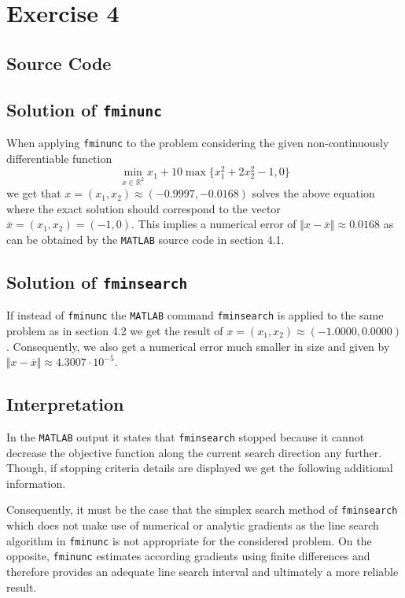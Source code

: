 \documentclass{article}
\begin{document}
	\section{Exercise 4}
	\subsection{Source Code}
	
	
	\subsection{Solution of \texttt{fminunc}}
	When applying \texttt{fminunc} to the problem considering the given non-continuously differentiable function 
	\begin{equation*}
		\min_{x\in\mathbb{R}^2}x_1+10\max\{x_1^2+2x_2^2-1,0\}
	\end{equation*}
	we get that $x=(x_1,x_2)\approx(-0.9997,-0.0168)$ solves the above equation where the exact solution should correspond to the vector $\overline{x}=(x_1,x_2)=(-1,0)$. This implies a numerical error of $\Vert x - \overline{x}\Vert \approx 0.0168$ as can be obtained by the \texttt{MATLAB} source code in section 4.1.
	\subsection{Solution of \texttt{fminsearch}}
	If instead of \texttt{fminunc} the \texttt{MATLAB} command \texttt{fminsearch} is applied to the same problem as in section 4.2 we get the result of $x=(x_1,x_2)\approx(-1.0000,0.0000)$. Consequently, we also get a numerical error much smaller in size and given by $\Vert x - \overline{x}\Vert \approx 4.3007\cdot 10^{-5}$.
	\subsection{Interpretation}
	In the \texttt{MATLAB} output it states that \texttt{fminsearch} stopped because it cannot decrease the objective function along the current search direction any further. Though, if stopping criteria details are displayed we get the following additional information.
	
	Consequently, it must be the case that the simplex search method of \texttt{fminsearch} which does not make use of numerical or analytic gradients as the line search algorithm in \texttt{fminunc} is not appropriate for the considered problem. On the opposite, \texttt{fminunc} estimates according gradients using finite differences and therefore provides an adequate line search interval and ultimately a more reliable result.
\end{document}
